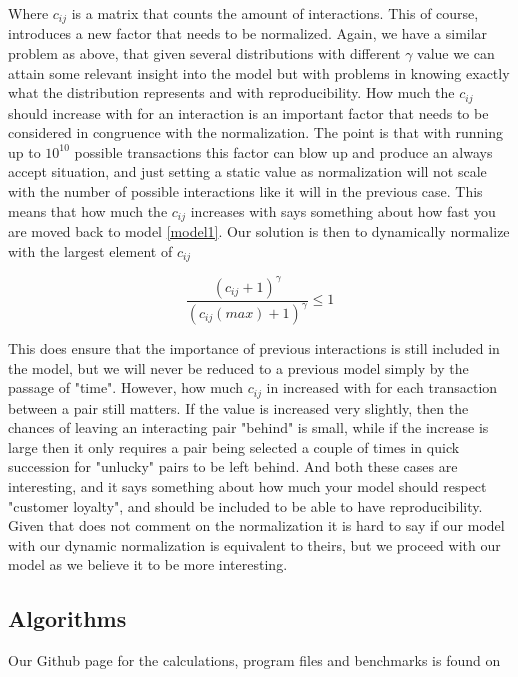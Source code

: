 \documentclass[a4paper,11pt]{article}
\begin{document}
{Where $c_{ij}$ is a matrix that counts the amount of interactions. This of course, introduces a new factor that needs to be normalized. Again, we have a similar problem as above, that given several distributions with different $\gamma$ value we can attain some relevant insight into the model but with problems in knowing exactly what the distribution represents and with reproducibility. How much the $c_{ij}$ should increase with for an interaction is an important factor that needs to be considered in congruence with the normalization. The point is that with running up to $10^{10}$ possible transactions this factor can blow up and produce an always accept situation, and just setting a static value as normalization will not scale with the number of possible interactions like it will in the previous case. This means that how much the $c_{ij}$ increases with says something about how fast you are moved back to model \ref{model1}. Our solution is then to dynamically normalize with the largest element of $c_{ij}$

\begin{equation}
\frac{(c_{ij} + 1)^{\gamma}}{(c_{ij}(max) + 1)^{\gamma}} \leq 1
\label{normalization}
\end{equation}

This does ensure that the importance of previous interactions is still included in the model, but we will never be reduced to a previous model simply by the passage of "time". However, how much $c_{ij}$ in increased with for each transaction between a pair still matters. If the value is increased very slightly, then the chances of leaving an interacting pair "behind" is small, while if the increase is large then it only requires a pair being selected a couple of times in quick succession for "unlucky" pairs to be left behind. And both these cases are interesting, and it says something about how much your model should respect "customer loyalty", and should be included to be able to have reproducibility. Given that \cite{AgentBasedModels} does not comment on the normalization it is hard to say if our model with our dynamic normalization is equivalent to theirs, but we proceed with our model as we believe it to be more interesting. 



\subsection*{Algorithms}

Our Github page for the calculations, program files and benchmarks is found on 

}
\end{document}
